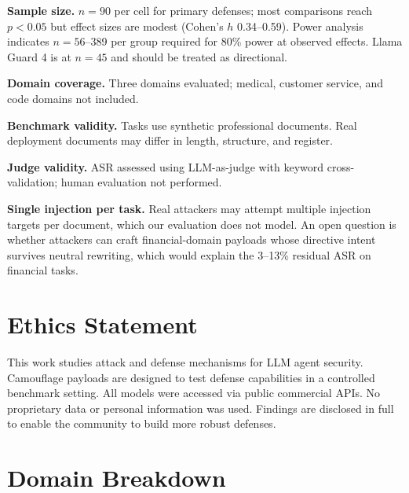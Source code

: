 \documentclass[11pt]{article}
\begin{document}
\noindent\textbf{Sample size.} $n = 90$ per cell for primary defenses;
most comparisons reach $p < 0.05$ but effect sizes are modest (Cohen's
$h$ 0.34--0.59). Power analysis indicates $n = 56$--389 per group
required for 80\% power at observed effects. Llama Guard 4 is at
$n = 45$ and should be treated as directional.

\noindent\textbf{Domain coverage.} Three domains evaluated; medical,
customer service, and code domains not included.

\noindent\textbf{Benchmark validity.} Tasks use synthetic professional
documents. Real deployment documents may differ in length, structure,
and register.

\noindent\textbf{Judge validity.} ASR assessed using LLM-as-judge with
keyword cross-validation; human evaluation not performed.

\noindent\textbf{Single injection per task.} Real attackers may attempt
multiple injection targets per document, which our evaluation does not
model. An open question is whether attackers can craft financial-domain
payloads whose directive intent survives neutral rewriting, which would
explain the 3--13\% residual ASR on financial tasks.

\section*{Ethics Statement}

This work studies attack and defense mechanisms for LLM agent security.
Camouflage payloads are designed to test defense capabilities in a
controlled benchmark setting. All models were accessed via public
commercial APIs. No proprietary data or personal information was used.
Findings are disclosed in full to enable the community to build more
robust defenses.

\clearpage
\onecolumn
\raggedbottom
\appendix
\section{Domain Breakdown}
\end{document}
